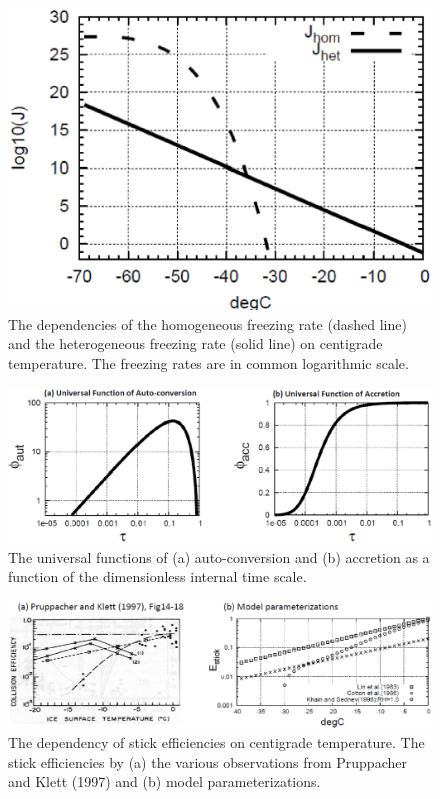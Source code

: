 \begin{figure}[htbp]
\begin{center}
\includegraphics[scale=0.5]{./figure/homo_frz_rate.eps}
\end{center}
\caption{The dependencies of the homogeneous freezing rate (dashed line) and the heterogeneous freezing rate (solid line) on centigrade temperature. The freezing rates are in common logarithmic scale.}
\label{figsn2-20}
\end{figure}

\begin{figure}[htbp]
\begin{center}
\includegraphics[scale=0.25]{./figure/univ_function.eps}
\end{center}
\caption{The universal functions of (a) auto-conversion and (b) accretion as a function of the dimensionless internal time scale.}
\label{figsn2-21}
\end{figure}

\begin{figure}[htbp]
\begin{center}
\includegraphics[scale=0.25]{./figure/stic_effic.eps}
\end{center}
\caption{The dependency of stick efficiencies on centigrade temperature. The stick efficiencies by (a) the various observations from Pruppacher and Klett (1997) and (b) model parameterizations.}
\label{figsn2-22}
\end{figure}

